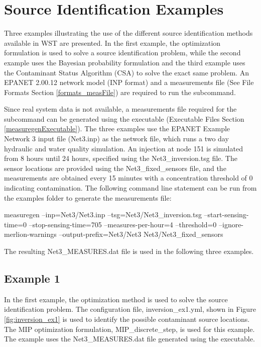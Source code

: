 \section{Source Identification Examples}
Three examples illustrating the use of the different source identification
methods available in WST are presented. In the first example, the optimization
formulation is used to solve a source identification problem, while the
second example uses the Bayesian probability formulation and the third example 
uses the Contaminant Status Algorithm (CSA) to solve the exact same problem. 
An EPANET 2.00.12 network model (INP format) and a measurements file (See File
Formats Section \ref{formats_measFile}) are required to run
the  subcommand. 

Since real system data is not available, a measurements file required for
the  subcommand can be generated using
the  executable (Executable Files Section \ref{measuregenExecutable}). 
The three examples use the EPANET Example Network 3 input file (Net3.inp) 
as the network file, which runs a two day hydraulic and water
quality simulation. An injection at node 151 is simulated 
from 8 hours until 24 hours, specified using
the Net3\_inversion.tsg file. The sensor locations are provided using
the Net3\_fixed\_sensors file, and the measurements are obtained every
15 minutes with a concentration threshold of 0 indicating
contamination. The following command line statement can be run from
the examples folder to generate the measurements file:

\begin{unknownListing}
measuregen --inp=Net3/Net3.inp --tsg=Net3/Net3_inversion.tsg --start-sensing-time=0 
--stop-sensing-time=705 --measures-per-hour=4 --threshold=0 --ignore-merlion-warnings 
--output-prefix=Net3/Net3 Net3/Net3_fixed_sensors
\end{unknownListing}

The resulting Net3\_MEASURES.dat file is used in the following three examples. 

\subsection{Example 1}  
In the first example, the optimization method is used to solve 
the source identification problem. The configuration file, 
inversion\_ex1.yml, shown in Figure \ref{fig:inversion_ex1} is used to
identify the possible contaminant source locations. The MIP
optimization formulation, MIP\_discrete\_step, is used for this
example. The example uses the Net3\_MEASURES.dat file
generated using the  executable.

